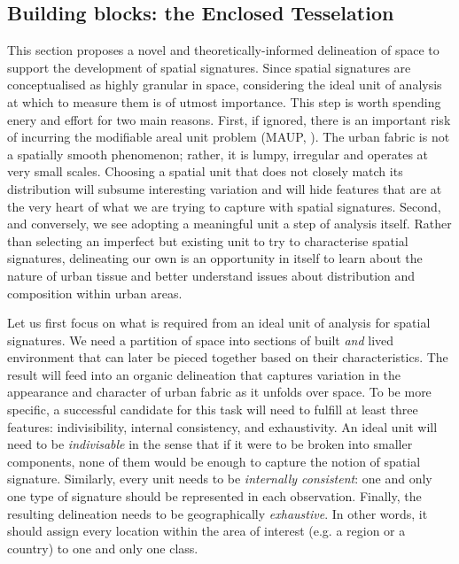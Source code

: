 \subsection{Building blocks: the Enclosed Tesselation}
\label{ssec:ss_et}

This section proposes a novel and theoretically-informed delineation of space to
support the development of spatial signatures.
Since spatial signatures are conceptualised as highly granular in space,
considering the ideal unit of analysis at which to measure them is of utmost
importance.
%
This step is worth spending enery and effort for two main reasons.
First, if ignored, there is an important risk of incurring the modifiable areal
unit problem (MAUP, \citealp{openshaw1981modifiable}). The urban fabric is not a
spatially smooth phenomenon; rather, it is lumpy, irregular and operates at very
small scales.
%
Choosing a spatial unit that does not closely match its distribution will
subsume interesting variation and will hide features that are at the very heart
of what we are trying to capture with spatial signatures.
Second, and conversely, we see adopting a meaningful unit a step of analysis
itself. Rather than selecting an imperfect but existing unit to try to
characterise spatial signatures, delineating our own is an opportunity in itself
to learn about the nature of urban tissue and better understand issues about
distribution and composition within urban areas.

Let us first focus on what is required from an ideal unit of analysis for
spatial signatures. We need a partition of space into sections of built
\textit{and} lived environment that can later be pieced together based on their
characteristics. The result will feed into an organic delineation that captures
variation in the appearance and character of urban fabric as it unfolds over
space.
%
To be more specific, a successful candidate for this task will need to fulfill
at least three features: indivisibility, internal consistency, and exhaustivity.
An ideal unit will need to be \textit{indivisable} in the sense that if it were
to be broken into smaller components, none of them would be enough to capture
the notion of spatial signature.
Similarly, every unit needs to be \textit{internally consistent}: one and only
one type of signature should be represented in each observation.
Finally, the resulting delineation needs to be geographically
\textit{exhaustive}. In other words, it should assign every location within the
area of interest (e.g. a region or a country) to one and only one class.

